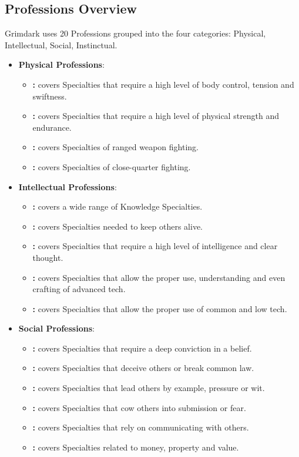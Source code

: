 \subsection{Professions Overview} \label{profession_overview_grouped}
	Grimdark uses 20 Professions grouped into the four categories: Physical, Intellectual, Social, Instinctual.
	\begin{itemize}
		\item \textbf{Physical Professions}:
		\begin{itemize}
			\item \textbf{:} covers Specialties that require a high level of body control, tension and swiftness.
			\item \textbf{:} covers Specialties that require a high level of physical strength and endurance.
			\item \textbf{:} covers Specialties of ranged weapon fighting.
			\item \textbf{:} covers Specialties of close-quarter fighting.
		\end{itemize}

		\item \textbf{Intellectual Professions}:
		\begin{itemize}
			\item \textbf{:} covers a wide range of Knowledge Specialties.
			\item \textbf{:} covers Specialties needed to keep others alive.
			\item \textbf{:} covers Specialties that require a high level of intelligence and clear thought.
			\item \textbf{:} covers Specialties that allow the proper use, understanding and even crafting of advanced tech.
			\item \textbf{:} covers Specialties that allow the proper use of common and low tech.		
		\end{itemize}

		\item \textbf{Social Professions}:
		\begin{itemize}
			\item \textbf{:} covers Specialties that require a deep conviction in a belief.
			\item \textbf{:} covers Specialties that deceive others or break common law.
			\item \textbf{:} covers Specialties that lead others by example, pressure or wit.
			\item \textbf{:} covers Specialties that cow others into submission or fear.
			\item \textbf{:} covers Specialties that rely on communicating with others.
			\item \textbf{:} covers Specialties related to money, property and value.
		\end{itemize}


\end{itemize}
